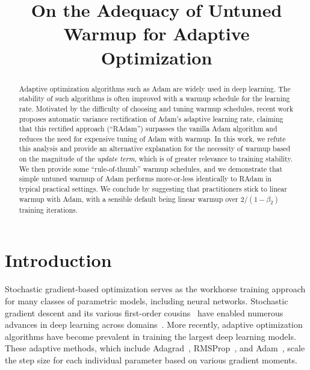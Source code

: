 \title{On the Adequacy of Untuned Warmup for Adaptive Optimization}



\maketitle

{
  \begin{abstract}
Adaptive optimization algorithms such as Adam are widely used in deep learning. The stability of such algorithms is often improved with a warmup schedule for the learning rate. Motivated by the difficulty of choosing and tuning warmup schedules, recent work proposes automatic variance rectification of Adam's adaptive learning rate, claiming that this rectified approach (``RAdam'') surpasses the vanilla Adam algorithm and reduces the need for expensive tuning of Adam with warmup. In this work, we refute this analysis and provide an alternative explanation for the necessity of warmup based on the magnitude of the \emph{update term}, which is of greater relevance to training stability. We then provide some ``rule-of-thumb'' warmup schedules, and we demonstrate that simple untuned warmup of Adam performs more-or-less identically to RAdam in typical practical settings. We conclude by suggesting that practitioners stick to linear warmup with Adam, with a sensible default being linear warmup over $2 / (1 - \beta_2)$ training iterations.  \end{abstract}

\section{Introduction}
\label{sec:intro}

Stochastic gradient-based optimization serves as the workhorse training approach for many classes of parametric models, including neural networks. Stochastic gradient descent and its various first-order cousins~\citep{polyak1964momentum, nesterov1983nag} have enabled numerous advances in deep learning across domains~\citep{krizhevsky2012alexnet, he2016resnet, gehring2017convs2s}. More recently, adaptive optimization algorithms have become prevalent in training the largest deep learning models. These adaptive methods, which include Adagrad~\citep{duchi2010adagrad}, RMSProp~\citep{hinton2012rmsprop}, and Adam~\citep{kingma2014adam}, scale the step size for each individual parameter based on various gradient moments.

}
